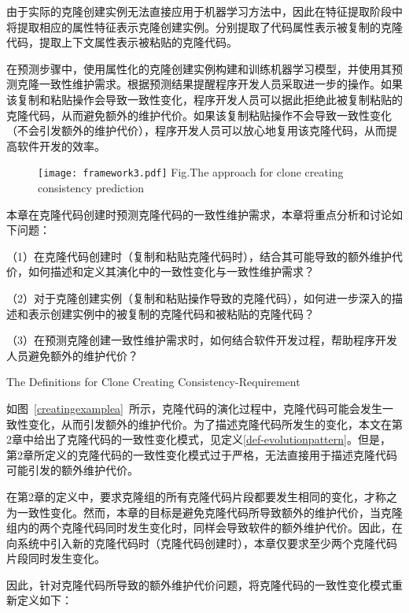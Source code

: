 由于实际的克隆创建实例无法直接应用于机器学习方法中，因此在特征提取阶段中将提取相应的属性特征表示克隆创建实例。分别提取了代码属性表示被复制的克隆代码，提取上下文属性表示被粘贴的克隆代码。

在预测步骤中，使用属性化的克隆创建实例构建和训练机器学习模型，并使用其预测克隆一致性维护需求。根据预测结果提醒程序开发人员采取进一步的操作。如果该复制和粘贴操作会导致一致性变化，程序开发人员可以据此拒绝此被复制粘贴的克隆代码，从而避免额外的维护代价。如果该复制粘贴操作不会导致一致性变化（不会引发额外的维护代价），程序开发人员可以放心地复用该克隆代码，从而提高软件开发的效率。

\begin{figure}[htbp]
\centering
\texttt{[image: framework3.pdf]}
{Fig.$\!$}{The approach for clone creating consistency prediction}
\vspace{-1em}
\end{figure}

本章在克隆代码创建时预测克隆代码的一致性维护需求，本章将重点分析和讨论如下问题：

（1）在克隆代码创建时（复制和粘贴克隆代码时），结合其可能导致的额外维护代价，如何描述和定义其演化中的一致性变化与一致性维护需求？

（2）对于克隆创建实例（复制和粘贴操作导致的克隆代码），如何进一步深入的描述和表示创建实例中的被复制的克隆代码和被粘贴的克隆代码？

（3）在预测克隆创建一致性维护需求时，如何结合软件开发过程，帮助程序开发人员避免额外的维护代价？

{The Definitions for Clone Creating Consistency-Requirement}

如图~\ref{creatingexamplea}~所示，克隆代码的演化过程中，克隆代码可能会发生一致性变化，从而引发额外的维护代价。为了描述克隆代码所发生的变化，本文在第2章中给出了克隆代码的一致性变化模式，见定义\ref{def-evolutionpattern}。但是，
第2章所定义的克隆代码的一致性变化模式过于严格，无法直接用于描述克隆代码可能引发的额外维护代价。

在第2章的定义中，要求克隆组的所有克隆代码片段都要发生相同的变化，才称之为一致性变化。然而，本章的目标是避免克隆代码所导致额外的维护代价，当克隆组内的两个克隆代码同时发生变化时，同样会导致软件的额外维护代价。因此，在向系统中引入新的克隆代码时（克隆代码创建时），本章仅要求至少两个克隆代码片段同时发生变化。

因此，针对克隆代码所导致的额外维护代价问题，将克隆代码的一致性变化模式重新定义如下：

